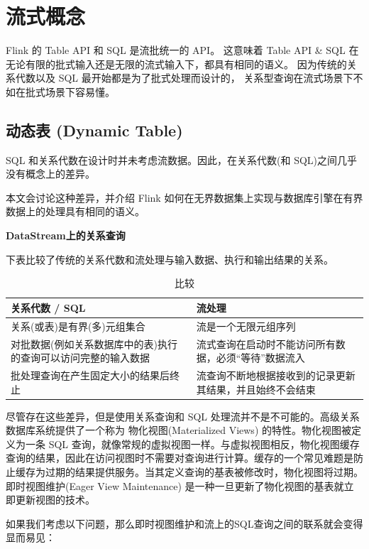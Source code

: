 \documentclass[cn,11pt,chinese]{elegantbook}
\begin{document}
\section{流式概念}

Flink 的 Table API 和 SQL 是流批统一的 API。 这意味着 Table API \& SQL 在无论有限的批式输入还是无限的流式输入下，都具有相同的语义。 因为传统的关系代数以及 SQL 最开始都是为了批式处理而设计的， 关系型查询在流式场景下不如在批式场景下容易懂。

\subsection{动态表 (Dynamic Table)}

SQL 和关系代数在设计时并未考虑流数据。因此，在关系代数(和 SQL)之间几乎没有概念上的差异。

本文会讨论这种差异，并介绍 Flink 如何在无界数据集上实现与数据库引擎在有界数据上的处理具有相同的语义。

\textbf{DataStream上的关系查询}

下表比较了传统的关系代数和流处理与输入数据、执行和输出结果的关系。

\begin{table}[htbp]
  \centering
  \caption{比较}
    \begin{tabularx}{\textwidth}{|X|X|}
    \toprule
    关系代数 / SQL  & 流处理 \\
    \midrule
    关系(或表)是有界(多)元组集合 & 流是一个无限元组序列 \\
    \hline
    对批数据(例如关系数据库中的表)执行的查询可以访问完整的输入数据 & 流式查询在启动时不能访问所有数据，必须“等待”数据流入 \\
    \hline
    批处理查询在产生固定大小的结果后终止 & 流查询不断地根据接收到的记录更新其结果，并且始终不会结束 \\
    \bottomrule
    \end{tabularx}%
  \label{tab:theorem-class}%
\end{table}%

尽管存在这些差异，但是使用关系查询和 SQL 处理流并不是不可能的。高级关系数据库系统提供了一个称为 物化视图(Materialized Views) 的特性。物化视图被定义为一条 SQL 查询，就像常规的虚拟视图一样。与虚拟视图相反，物化视图缓存查询的结果，因此在访问视图时不需要对查询进行计算。缓存的一个常见难题是防止缓存为过期的结果提供服务。当其定义查询的基表被修改时，物化视图将过期。 即时视图维护(Eager View Maintenance) 是一种一旦更新了物化视图的基表就立即更新视图的技术。

如果我们考虑以下问题，那么即时视图维护和流上的SQL查询之间的联系就会变得显而易见：
\end{document}

